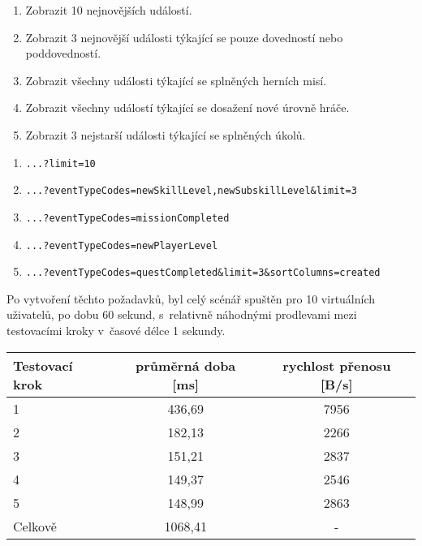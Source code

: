 \documentclass[twoside, 12pt]{article}
\begin{document}
{{\begin{enumerate}
\item Zobrazit 10 nejnovějších událostí.
\item Zobrazit 3 nejnovější události týkající se pouze dovedností nebo poddovedností.
\item Zobrazit všechny události týkající se splněných herních misí.
\item Zobrazit všechny událostí týkající se dosažení nové úrovně hráče.
\item Zobrazit 3 nejstarší události týkající se splněných úkolů.
\end{enumerate}



\begin{enumerate}
\item \texttt{...?limit=10}
\item \texttt{...?eventTypeCodes=newSkillLevel,newSubskillLevel\&limit=3}
\item \texttt{...?eventTypeCodes=missionCompleted}
\item \texttt{...?eventTypeCodes=newPlayerLevel}
\item \texttt{...?eventTypeCodes=questCompleted\&limit=3\&sortColumns=created}
\end{enumerate}

\clearpage

Po vytvoření těchto požadavků, byl celý scénář spuštěn pro 10 virtuálních uživatelů,
po dobu 60 sekund, s~relativně náhodnými prodlevami mezi testovacími kroky v~časové délce 1 sekundy.

\vspace{10}


\def\arraystretch{1.2}
\begin{tabular}{|l|c|c|}
\hline
\textbf{Testovací krok} & \textbf{průměrná doba [ms]} & \textbf{rychlost přenosu [B/s]} \\
\hline
1 & 436,69 & 7956 \\
\hline
2 & 182,13 & 2266 \\
\hline
3 & 151,21 & 2837 \\
\hline
4 & 149,37 & 2546 \\
\hline
5 & 148,99 & 2863 \\
\hline
Celkově & 1068,41 & - \\
\hline
\end{tabular}
\endtab

}}
\end{document}
